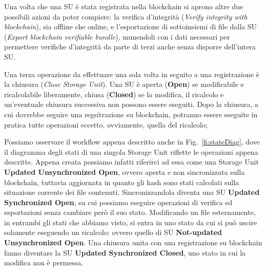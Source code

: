 Una volta che una SU è stata registrata nella blockchain si aprono altre
due possibili azioni da poter compiere: la verifica d'integrità (\emph{Verify integrity with blockchain}),
sia offline che online, e l'esportazione di sottoinsiemi di file dalla SU (\emph{Export blockchain verifiable bundle}),
munendoli con i dati necessari per permettere verifiche d'integrità da parte di terzi
anche senza disporre dell'intera SU.

Una terza operazione da effettuare una sola volta in seguito a una registrazione è la chiusura
(\emph{Close Storage Unit}).
Una SU è aperta (\textbf{Open}) se modificabile e ricalcolabile liberamente,
chiusa (\textbf{Closed}) se la modifica, il ricalcolo e un'eventuale chiusura
successiva non possono essere eseguiti. Dopo la chiusura, a cui dovrebbe
seguire una regsitrazione su blockchain, potranno essere eseguite
in pratica tutte operazioni eccetto, ovviamente, quella del ricalcolo;

Possiamo osservare il workflow appena descritto anche in Fig.~\ref{fi:stateDiag}, dove il diagramma degli
stati di una singola Storage Unit riflette le operazioni appena descritte.
Appena creata possiamo infatti riferirci ad essa come una Storage Unit \textbf{Updated Unsynchronized Open},
ovvero aperta e non sincronizzata sulla blockchain, tuttavia aggiornata in quanto gli hash sono stati calcolati
sulla situazione corrente dei file contenuti. Sincronizzandola diventa una SU \textbf{Updated Synchronized Open},
su cui possiamo eseguire operazioni di verifica ed esportazioni senza cambiare però il suo stato.
Modificando un file esternamente, in entrambi gli stati che abbiamo visto, si entra in uno stato da cui si
può uscire solamente eseguendo un ricalcolo: ovvero quello di SU \textbf{Not-updated Unsynchronized Open}.
Una chiusura unita con una registrazione su blockchain fanno diventare la SU
\textbf{Updated Synchronized Closed}, uno stato in cui la modifica non è permessa.


